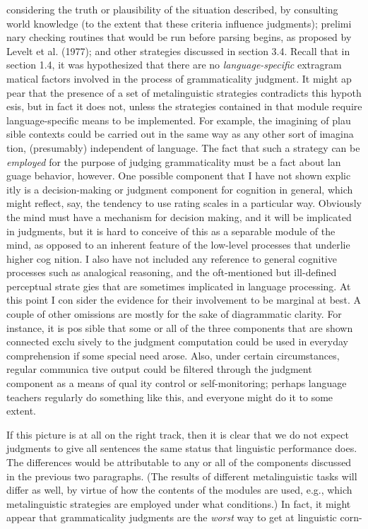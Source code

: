 \clearpage\setcounter{page}{1}\begin{styleTextbody}
considering the truth or plausibility of the situation described, by consulting world knowledge (to the extent that these criteria influence judgments); prelimi\- nary checking routines that would be run before parsing begins, as proposed by Levelt et al. (1977); and other strategies discussed in section 3.4. Recall that in section 1.4, it was hypothesized that there are no \textit{language-specific}\textit{ }extragram\- matical factors involved in the process of grammaticality judgment. It might ap\- pear that the presence of a set of metalinguistic strategies contradicts this hypoth\- esis, but in fact it does not, unless the strategies contained in that module require language-specific means to be implemented. For example, the imagining of plau\- sible contexts could be carried out in the same way as any other sort of imagina\- tion, (presumably) independent of language. The fact that such a strategy can be \textit{employed}\textit{ }for the purpose of judging grammaticality must be a fact about lan\- guage behavior, however. One possible component that I have not shown explic\- itly is a decision-making or judgment component for cognition in general, which might reflect, say, the tendency to use rating scales in a particular way. Obviously the mind must have a mechanism for decision making, and it will be implicated in judgments, but it is hard to conceive of this as a separable module of the mind, as opposed to an inherent feature of the low-level processes that underlie higher cog\- nition. I also have not included any reference to general cognitive processes such as analogical reasoning, and the oft-mentioned but ill-defined perceptual strate\- gies that are sometimes implicated in language processing. At this point I con\- sider the evidence for their involvement to be marginal at best. A couple of other omissions are mostly for the sake of diagrammatic clarity. For instance, it is pos\- sible that some or all of the three components that are shown connected exclu\- sively to the judgment computation could be used in everyday comprehension if some special need arose. Also, under certain circumstances, regular communica\- tive output could be filtered through the judgment component as a means of qual\- ity control or self-monitoring; perhaps language teachers regularly do something like this, and everyone might do it to some extent.
\end{styleTextbody}


\begin{styleTextbody}
If this picture is at all on the right track, then it is clear that we do not expect judgments to give all sentences the same status that linguistic performance does. The differences would be attributable to any or all of the components discussed in the previous two paragraphs. (The results of different metalinguistic tasks will differ as well, by virtue of how the contents of the modules are used, e.g., which metalinguistic strategies are employed under what conditions.) In fact, it might appear that grammaticality judgments are the \textit{worst}\textit{ }way to get at linguistic corn-
\end{styleTextbody}


